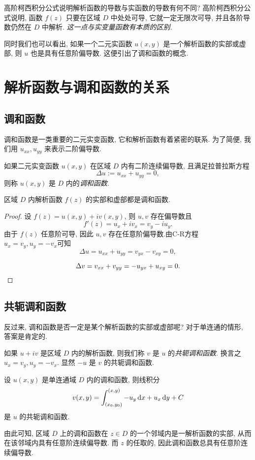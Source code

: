 高阶柯西积分公式说明解析函数的导数与实函数的导数有何不同?
高阶柯西积分公式说明, 函数 $f(z)$ 只要在区域 $D$ 中处处可导, 它就一定无限次可导, 并且各阶导数仍然在 $D$ 中解析.
\emph{这一点与实变量函数有本质的区别.}

同时我们也可以看出, 如果一个二元实函数 $u(x,y)$ 是一个解析函数的实部或虚部, 则 $u$ 也是具有任意阶偏导数.
这便引出了调和函数的概念.

\section{解析函数与调和函数的关系}

\subsection{调和函数}

调和函数是一类重要的二元实变函数, 它和解析函数有着紧密的联系.
为了简便, 我们用 $u_{xx},u_{yy}$ 来表示二阶偏导数.

\begin{definition}
	如果二元实变函数 $u(x,y)$ 在区域 $D$ 内有二阶连续偏导数, 且满足拉普拉斯方程
	\[\Delta u:=u_{xx}+u_{yy}=0,\]
	则称 $u(x,y)$ 是 $D$ 内的\emph{调和函数}.
\end{definition}

\begin{theorem}
	区域 $D$ 内解析函数 $f(z)$ 的实部和虚部都是调和函数.
\end{theorem}

\begin{proof}
	设 $f(z)=u(x,y)+iv(x,y)$, 则 $u,v$ 存在偏导数且
		\[f'(z)=u_x+iv_x=v_y-iu_y.\]
	{由于 $f(z)$ 任意阶可导, 因此 $u,v$ 存在任意阶偏导数.由C-R方程 $u_x=v_y,u_y=-v_x$可知
		\[\Delta u=u_{xx}+u_{yy}=v_{yx}-v_{xy}=0,\]}

	{
		\[\Delta v=v_{xx}+v_{yy}=-u_{yx}+u_{xy}=0.\qedhere\]}
\end{proof}

\subsection{共轭调和函数}

反过来, 调和函数是否一定是某个解析函数的实部或虚部呢?
对于单连通的情形, 答案是肯定的.

如果 $u+iv$ 是区域 $D$ 内的解析函数, 则我们称 $v$ 是 $u$ 的\emph{共轭调和函数}.
换言之 $u_x=v_y,u_y=-v_x$.
显然 $-u$ 是 $v$ 的共轭调和函数.
\begin{theorem}
	设 $u(x,y)$ 是单连通域 $D$ 内的调和函数, 则线积分
	\[v(x,y)=\int_{(x_0,y_0)}^{(x,y)}-u_y\,\mathrm{d} x+u_x\,\mathrm{d} y+C\]
	是 $u$ 的共轭调和函数.
\end{theorem}
由此可知, 区域 $D$ 上的调和函数在 $z\in D$ 的一个邻域内是一解析函数的实部, 从而在该邻域内具有任意阶连续偏导数.
而 $z$ 的任取的, 因此调和函数总具有任意阶连续偏导数.

